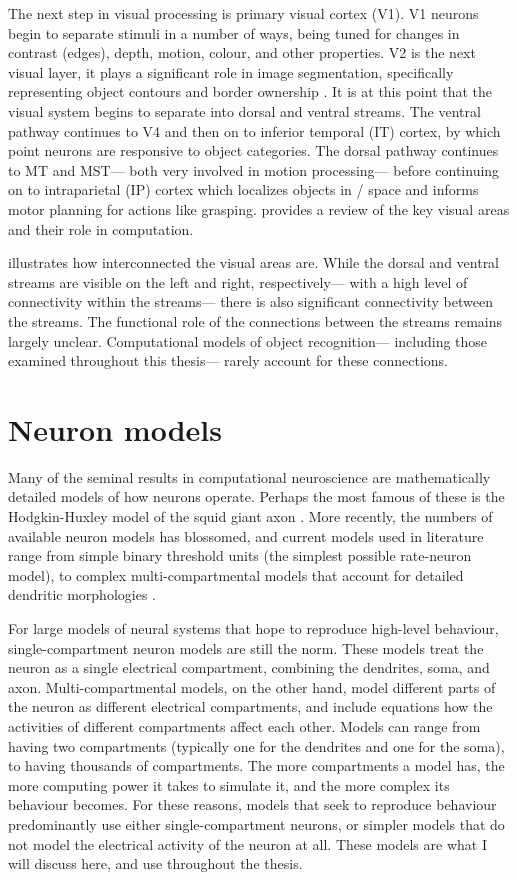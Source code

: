 The next step in visual processing is primary visual cortex (V1).
V1 neurons begin to separate stimuli in a number of ways,
being tuned for changes in contrast (edges), depth, motion, colour, and other properties.
V2 is the next visual layer, it plays a significant role in image segmentation,
specifically representing object contours and border ownership \parencite{Kruger2013}.
It is at this point that the visual system begins to separate
into dorsal and ventral streams.
The ventral pathway continues to V4 and then on to inferior temporal (IT) cortex,
by which point neurons are responsive to object categories.
The dorsal pathway continues to MT and MST---%
both very involved in motion processing---%
before continuing on to intraparietal (IP) cortex
which localizes objects in \ddd/ space and informs motor planning
for actions like grasping.
\textcite{Kruger2013} provides a review of the key visual areas
and their role in computation.

 illustrates how interconnected the visual areas are.
While the dorsal and ventral streams are visible on the left and right, respectively---%
with a high level of connectivity within the streams---%
there is also significant connectivity between the streams.
The functional role of the connections between the streams
remains largely unclear.
Computational models of object recognition---%
including those examined throughout this thesis---%
rarely account for these connections.


\section{Neuron models}

Many of the seminal results in computational neuroscience
are mathematically detailed models of how neurons operate.
Perhaps the most famous of these is the Hodgkin-Huxley model
of the squid giant axon \parencite{Hodgkin1952}.
More recently, the numbers of available neuron models has blossomed,
and current models used in literature range from simple
binary threshold units \parencite{Stocks2001a} (the simplest possible rate-neuron model),
to complex multi-compartmental models
that account for detailed dendritic morphologies \parencite[\eg/][]{Markram2015,}.

For large models of neural systems that hope to reproduce high-level behaviour,
single-compartment neuron models are still the norm.
These models treat the neuron as a single electrical compartment,
combining the dendrites, soma, and axon.
Multi-compartmental models, on the other hand,
model different parts of the neuron as different electrical compartments,
and include equations how the activities of different compartments affect each other.
Models can range from having two compartments
(typically one for the dendrites and one for the soma),
to having thousands of compartments.
The more compartments a model has,
the more computing power it takes to simulate it,
and the more complex its behaviour becomes.
For these reasons, models that seek to reproduce behaviour
predominantly use either single-compartment neurons,
or simpler models that do not model the electrical activity of the neuron at all.
These models are what I will discuss here,
and use throughout the thesis.

